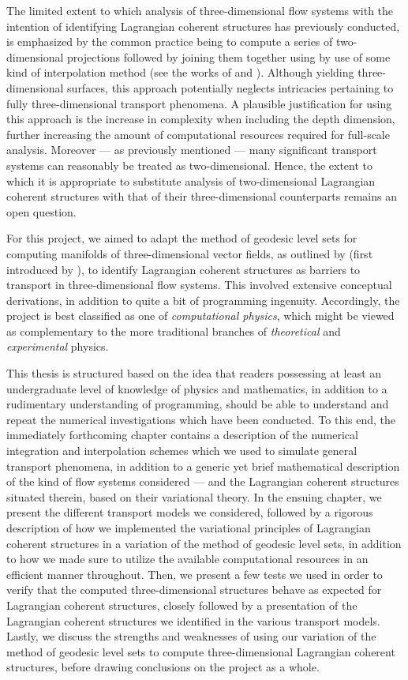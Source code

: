 The limited extent to which analysis of three-dimensional flow systems with the
intention of identifying Lagrangian coherent structures has previously
conducted, is emphasized by the common practice being to compute a series of
two-dimensional projections followed by joining them together using by use of
some kind of interpolation method (see the works of
\textcite{blazevski2014hyperbolic} and \textcite{oettinger2016autonomous}).
Although yielding three-dimensional surfaces, this approach potentially
neglects intricacies pertaining to fully three-dimensional transport phenomena.
A plausible justification for using this approach is the increase in complexity
when including the depth dimension, further increasing the amount of
computational resources required for full-scale analysis. Moreover --- as
previously mentioned --- many significant transport systems can reasonably be
treated as two-dimensional. Hence, the extent to which it is appropriate to
substitute analysis of two-dimensional Lagrangian coherent structures with that
of their three-dimensional counterparts remains an open question.

For this project, we aimed to adapt the method of geodesic level sets for
computing manifolds of three-dimensional vector fields, as outlined by
\textcite{krauskopf2005survey} (first introduced by
\textcite{krauskopf2003computing}), to identify Lagrangian coherent structures
as barriers to transport in three-dimensional flow systems. This involved
extensive conceptual derivations, in addition to quite a bit of programming
ingenuity. Accordingly, the project is best classified as one of
\emph{computational physics}, which might be viewed as complementary to the
more traditional branches of \emph{theoretical} and \emph{experimental}
physics.

This thesis is structured based on the idea that readers possessing
at least an undergraduate level of knowledge of physics and mathematics, in
addition to a rudimentary understanding of programming, should be able to
understand and repeat the numerical investigations which have been conducted.
To this end, the immediately forthcoming chapter contains a description of the
numerical integration and interpolation schemes which we used to simulate
general transport phenomena, in addition to a generic yet brief mathematical
description of the kind of flow systems considered --- and the Lagrangian
coherent structures situated therein, based on their variational theory. In the
ensuing chapter, we present the different transport models we considered,
followed by a rigorous description of how we implemented the variational
principles of Lagrangian coherent structures in a variation of the method of
geodesic level sets, in addition to how we made sure to utilize the available
computational resources in an efficient manner throughout. Then, we present a
few tests we used in order to verify that the computed three-dimensional
structures behave as expected for Lagrangian coherent structures, closely
followed by a presentation of the Lagrangian coherent structures we identified
in the various transport models. Lastly, we discuss the strengths and
weaknesses of using our variation of the method of geodesic level sets to
compute three-dimensional Lagrangian coherent structures, before drawing
conclusions on the project as a whole.
